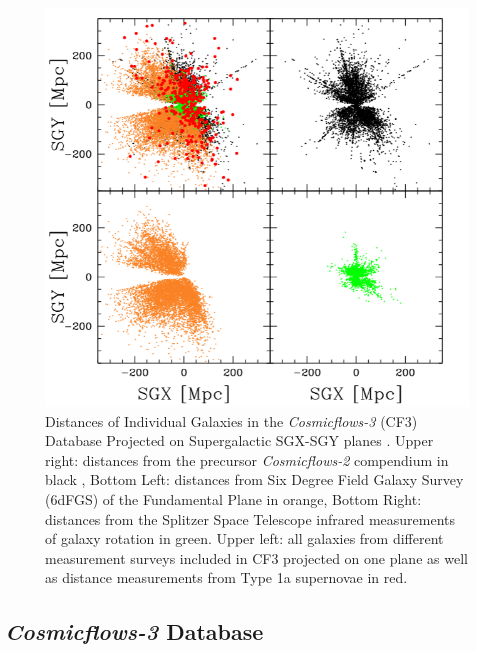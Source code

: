 \begin{figure}[h]
	\centering
	\includegraphics[width=\textwidth]{CF3}
	\caption{Distances of Individual Galaxies in the \textit{Cosmicflows-3} (CF3) Database Projected on Supergalactic SGX-SGY planes  \cite{Tully2016:cf3}. Upper right: distances from the precursor \textit{Cosmicflows-2} compendium in black \cite{Tully2013:cf2}, Bottom Left: distances from Six Degree Field Galaxy Survey (6dFGS) of the Fundamental Plane in orange, Bottom Right: distances from the Splitzer Space Telescope infrared measurements of galaxy rotation in green. Upper left: all galaxies from different measurement surveys included in CF3 projected on one plane as well as distance measurements from Type 1a supernovae in red.}
	\label{fig:CF3}
\end{figure}


\subsection{\textit{Cosmicflows-3} Database}


